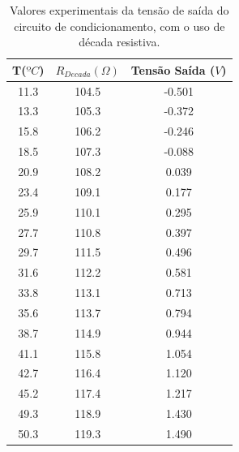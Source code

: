 \documentclass[a4paper]{instrumentacao}
\begin{document}
\begin{table}[H]
\centering
\caption{Valores experimentais da tensão de saída do circuito de condicionamento, com o uso de década resistiva.}
\label{tab:termometro-simulacao-decada}
\begin{tabular}{|c|c|c|}
\hline
\textbf{T($ºC$)} & \textbf{$R_{Decada}(\Omega)$} & \textbf{Tensão Saída ($V$)} \\ \hline
11.3           & 104.5                    & -0.501                    \\ \hline
13.3           & 105.3                    & -0.372                    \\ \hline
15.8           & 106.2                    & -0.246                    \\ \hline
18.5           & 107.3                    & -0.088                    \\ \hline
20.9           & 108.2                    & 0.039                     \\ \hline
23.4           & 109.1                    & 0.177                     \\ \hline
25.9           & 110.1                    & 0.295                     \\ \hline
27.7           & 110.8                    & 0.397                     \\ \hline
29.7           & 111.5                    & 0.496                     \\ \hline
31.6           & 112.2                    & 0.581                     \\ \hline
33.8           & 113.1                    & 0.713                     \\ \hline
35.6           & 113.7                    & 0.794                     \\ \hline
38.7           & 114.9                    & 0.944                     \\ \hline
41.1           & 115.8                    & 1.054                     \\ \hline
42.7           & 116.4                    & 1.120                     \\ \hline
45.2           & 117.4                    & 1.217                     \\ \hline
49.3           & 118.9                    & 1.430                     \\ \hline
50.3           & 119.3                    & 1.490                     \\ \hline
\end{tabular}
\end{table}
\end{document}
